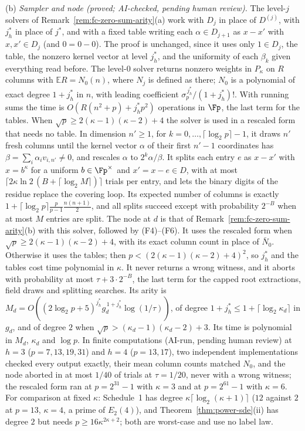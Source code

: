 \begin{remark}
\textup{(b)} \emph{Sampler and node (proved; AI-checked, pending human review).} The level-$j$ solvers of Remark~\ref{rem:fc-zero-sum-arity}(a) work with $D_j$ in place of $D^{(j)}$, with $j^*_h$ in place of $j^*$, and with a fixed table writing each $\alpha \in D_{j+1}$ as $x - x'$ with $x,x' \in D_j$ (and $0 = 0 - 0$). The proof is unchanged, since it uses only $1 \in D_j$, the table, the nonzero kernel vector at level $j^*_h$, and the uniformity of each $\beta_k$ given everything read before. The level-$0$ solver returns nonzero weights in $P_\kappa$ on $R$ columns with $\mathbb{E}R = N_0(n)$, where $N_j$ is defined as there; $N_0$ is a polynomial of exact degree $1 + j^*_h$ in $n$, with leading coefficient $\sigma_p^{\,j^*_h}/(1+j^*_h)!$. With running sums the time is $O(R(n^2+p) + j^*_hp^2)$ operations in $\Fp$, the last term for the tables. When $\sqrt p \ge 2(\kappa-1)(\kappa-2)+4$ the solver is used in a rescaled form that needs no table. In dimension $n' \ge 1$, for $k = 0,\dots,\lceil\log_2p\rceil-1$, it draws $n'$ fresh columns until the kernel vector $\alpha$ of their first $n'-1$ coordinates has $\beta = \sum_i\alpha_iv_{i,n'} \ne 0$, and rescales $\alpha$ to $2^k\alpha/\beta$. It splits each entry $e$ as $x - x'$ with $x = b^\kappa$ for a uniform $b \in \Fp^\times$ and $x' = x - e \in D$, with at most $\lceil 2\kappa\ln 2\,(B + \lceil\log_2M\rceil)\rceil$ trials per entry, and lets the binary digits of the residue replace the covering loop. Its expected number of columns is exactly $1 + \lceil\log_2p\rceil\frac{p}{p-1}\frac{n(n+1)}{2}$, and all splits succeed except with probability $2^{-B}$ when at most $M$ entries are split. The node at $d$ is that of Remark~\ref{rem:fc-zero-sum-arity}(b) with this solver, followed by (F4)--(F6). It uses the rescaled form when $\sqrt p \ge 2(\kappa-1)(\kappa-2)+4$, with its exact column count in place of $\bar N_0$. Otherwise it uses the tables; then $p < (2(\kappa-1)(\kappa-2)+4)^2$, so $j^*_h$ and the tables cost time polynomial in $\kappa$. It never returns a wrong witness, and it aborts with probability at most $\tau + 3\cdot2^{-B}$, the last term for the capped root extractions, field draws and splitting searches. Its arity is $M_d = O((2\log_2p+5)^{j^*_h}g_d^{\,1+j^*_h}\log(1/\tau))$, of degree $1 + j^*_h \le 1 + \lceil\log_2\kappa_d\rceil$ in $g_d$, and of degree $2$ when $\sqrt p > (\kappa_d-1)(\kappa_d-2)+3$. Its time is polynomial in $M_d$, $\kappa_d$ and $\log p$. In finite computations (AI-run, pending human review) at $h = 3$ ($p = 7,13,19,31$) and $h = 4$ ($p = 13,17$), two independent implementations checked every output exactly, their mean column counts matched $N_0$, and the node aborted in at most $1/40$ of trials at $\tau = 1/20$, never with a wrong witness; the rescaled form ran at $p = 2^{31}-1$ with $\kappa = 3$ and at $p = 2^{61}-1$ with $\kappa = 6$. For comparison at fixed $\kappa$: Schedule~1 has degree $\kappa\lceil\log_2(\kappa+1)\rceil$ ($12$ against $2$ at $p = 13$, $\kappa = 4$, a prime of $E_2(4)$), and Theorem~\ref{thm:power-sde}(ii) has degree $2$ but needs $p \ge 16\kappa^{2\kappa+2}$; both are worst-case and use no label law.


\end{remark}
